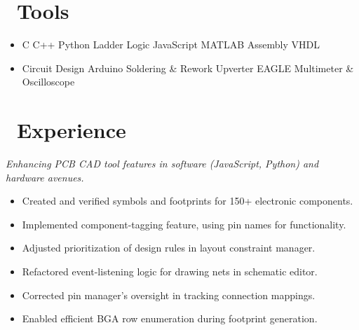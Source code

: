 \documentclass{resume}
\begin{document}



\section{\faWrench\ Tools}

\begin{itemize}[parsep=0.5ex]
  \item %
  C\textperiodcentered 
  C++\textperiodcentered
  Python\textperiodcentered
  Ladder Logic\textperiodcentered
  JavaScript\textperiodcentered
  MATLAB\textperiodcentered
  Assembly\textperiodcentered
  VHDL

  \item %
  Circuit Design\textperiodcentered
  Arduino\textperiodcentered
  Soldering \& Rework\textperiodcentered
  Upverter\textperiodcentered
  EAGLE\textperiodcentered
  Multimeter \& Oscilloscope
  
\end{itemize}

\section{\faLineChart\ Experience}

\textit{Enhancing PCB CAD tool features in software (JavaScript, Python) and hardware avenues.}
\begin{itemize}
  \item Created and verified symbols and footprints for 150+ electronic components.
  \item Implemented component-tagging feature, using pin names for functionality.
  \item Adjusted prioritization of design rules in layout constraint manager.
  \item Refactored event-listening logic for drawing nets in schematic editor.
  \item Corrected pin manager's oversight in tracking connection mappings.
  \item Enabled efficient BGA row enumeration during footprint generation.
\end{itemize}
\end{document}
